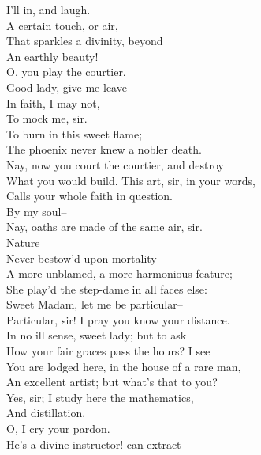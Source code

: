 \documentclass{memoir}
\begin{document}
\begin{drama*}
\facespeaks {} I'll in, and laugh.\\
\mammonspeaks  A certain touch, or air,\\
 That sparkles a divinity, beyond\\
 An earthly beauty!\\
\dolspeaks {} O, you play the courtier.\\
\mammonspeaks  Good lady, give me leave--\\
\dolspeaks {} In faith, I may not,\\
 To mock me, sir.\\
\mammonspeaks {} To burn in this sweet flame;\\
 The phoenix never knew a nobler death.\\
\dolspeaks  Nay, now you court the courtier, and destroy\\
 What you would build. This art, sir, in your words,\\
 Calls your whole faith in question.\\
\mammonspeaks {} By my soul--\\
\dolspeaks  Nay, oaths are made of the same air, sir.\\
\mammonspeaks {} Nature\\
 Never bestow'd upon mortality\\
 A more unblamed, a more harmonious feature;\\
 She play'd the step-dame in all faces else:\\
 Sweet Madam, let me be particular--\\
\dolspeaks  Particular, sir! I pray you know your distance.\\
\mammonspeaks  In no ill sense, sweet lady; but to ask\\
 How your fair graces pass the hours? I see\\
 You are lodged here, in the house of a rare man,\\
 An excellent artist; but what's that to you?\\
\dolspeaks  Yes, sir; I study here the mathematics,\\
 And distillation.\\
\mammonspeaks {} O, I cry your pardon.\\
 He's a divine instructor! can extract\\

\end{drama*}
\end{document}
